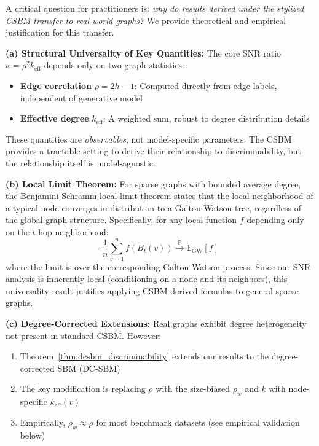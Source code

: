 
\begin{remark}
\label{rem:csbm_real_bridge}
A critical question for practitioners is: \textit{why do results derived under the stylized CSBM transfer to real-world graphs?} We provide theoretical and empirical justification for this transfer.

\textbf{(a) Structural Universality of Key Quantities:}
The core SNR ratio $\kappa = \rho^2 k_{\mathrm{eff}}$ depends only on two graph statistics:
\begin{itemize}
    \item \textbf{Edge correlation} $\rho = 2h - 1$: Computed directly from edge labels, independent of generative model
    \item \textbf{Effective degree} $k_{\mathrm{eff}}$: A weighted sum, robust to degree distribution details
\end{itemize}
These quantities are \textit{observables}, not model-specific parameters. The CSBM provides a tractable setting to derive their relationship to discriminability, but the relationship itself is model-agnostic.

\textbf{(b) Local Limit Theorem:}
For sparse graphs with bounded average degree, the Benjamini-Schramm local limit theorem states that the local neighborhood of a typical node converges in distribution to a Galton-Watson tree, regardless of the global graph structure. Specifically, for any local function $f$ depending only on the $t$-hop neighborhood:
\begin{equation}
    \frac{1}{n}\sum_{v=1}^n f(B_t(v)) \xrightarrow{\mathbb{P}} \mathbb{E}_{\mathrm{GW}}[f]
\end{equation}
where the limit is over the corresponding Galton-Watson process. Since our SNR analysis is inherently local (conditioning on a node and its neighbors), this universality result justifies applying CSBM-derived formulas to general sparse graphs.

\textbf{(c) Degree-Corrected Extensions:}
Real graphs exhibit degree heterogeneity not present in standard CSBM. However:
\begin{enumerate}
    \item Theorem~\ref{thm:dcsbm_discriminability} extends our results to the degree-corrected SBM (DC-SBM)
    \item The key modification is replacing $\rho$ with the size-biased $\rho_w$ and $k$ with node-specific $k_{\mathrm{eff}}(v)$
    \item Empirically, $\rho_w \approx \rho$ for most benchmark datasets (see empirical validation below)
\end{enumerate}


\end{remark}
